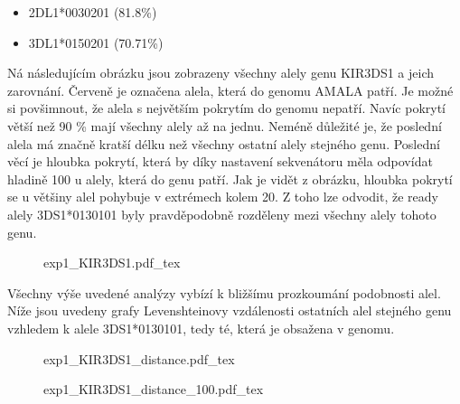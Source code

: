 \documentclass[czech,DP]{thesiskiv}
\numberwithin{equation}{section}
\begin{document}
\begin{multicols}{2}
\begin{itemize}
	\itemsep0em
	\item 2DL1*0030201 (81.8\%)
	\item 3DL1*0150201 (70.71\%)
\end{itemize}
\end{multicols}

\noindent
Ná následujícím obrázku jsou zobrazeny všechny alely genu KIR3DS1 a jeich zarovnání. Červeně je označena alela, která do genomu AMALA patří. Je možné si povšimnout, že alela s největším pokrytím do genomu nepatří. Navíc pokrytí větší než 90 \% mají všechny alely až na jednu. Neméně důležité je, že poslední alela má značně kratší délku než všechny ostatní alely stejného genu. Poslední věcí je hloubka pokrytí, která by díky nastavení sekvenátoru měla odpovídat hladině 100 u alely, která do genu patří. Jak je vidět z obrázku, hloubka pokrytí se u většiny alel pohybuje v extrémech kolem 20. Z toho lze odvodit, že ready alely 3DS1*0130101 byly pravděpodobně rozděleny mezi všechny alely tohoto genu.

\begin{figure}[H]
    \centering
    \def\svgwidth{\columnwidth}
    {exp1_KIR3DS1.pdf_tex} 
\end{figure}

\noindent
Všechny výše uvedené analýzy vybízí k bližšímu prozkoumání podobnosti alel. Níže jsou uvedeny grafy Levenshteinovy vzdálenosti ostatních alel stejného genu vzhledem k alele 3DS1*0130101, tedy té, která je obsažena v genomu.

\begin{figure}[H]
	\centering
    \def\svgwidth{\columnwidth}
    {exp1_KIR3DS1_distance.pdf_tex} 
\end{figure}

\begin{figure}[H]
	\centering
    \def\svgwidth{\columnwidth}
    {exp1_KIR3DS1_distance_100.pdf_tex} 
\end{figure}
 
\end{document}
